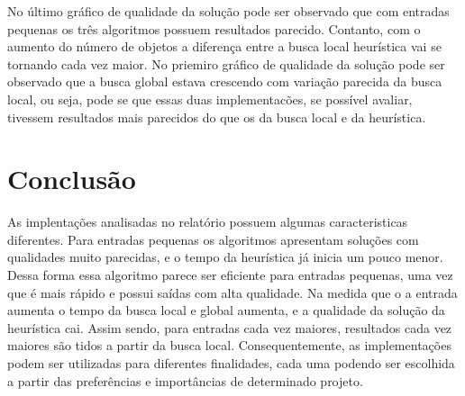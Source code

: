 \documentclass[a4paper,11pt,final]{article}
\begin{document}
No último gráfico de qualidade da solução pode ser observado que com entradas pequenas os três algoritmos 
possuem resultados parecido. Contanto, com o aumento do número de objetos a diferença entre a busca local
heurística vai se tornando cada vez maior. No priemiro gráfico de qualidade da solução pode ser observado 
que a busca global estava crescendo com variação parecida da busca local, ou seja, pode se que
essas duas implementacões, se possível avaliar, tivessem resultados mais parecidos do que os da 
busca local e da heurística.


\section{Conclusão}

As implentações analisadas no relatório possuem algumas caracteristicas diferentes. Para entradas pequenas 
os algoritmos apresentam soluções com qualidades muito parecidas, e o tempo da heurística 
já inicia um pouco menor. Dessa forma essa algoritmo parece ser eficiente para entradas pequenas, 
uma vez que é mais rápido e possui saídas com alta qualidade. Na medida que o a entrada aumenta o tempo da
busca local e global aumenta, e a qualidade da solução da heurística cai. Assim sendo, para entradas cada vez
maiores, resultados cada vez maiores são tidos a partir da busca local. Consequentemente, as implementações 
podem ser utilizadas para diferentes finalidades, cada uma podendo ser escolhida a partir das preferências e 
importâncias de determinado projeto.
\end{document}
